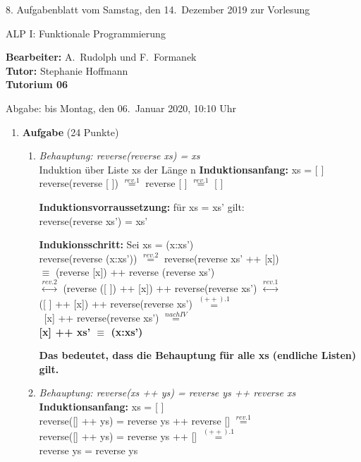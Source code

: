 \documentclass[11pt]{article}
\newcommand{\VORLESUNG}{ALP I: Funktionale Programmierung}
\newcommand{\STAFF}{A.\ Rudolph und F.\ Formanek}
\newcommand{\ASSIGNMENT}{8}
\newcommand{\HANDOUT}{Samstag, den 14.\ Dezember   2019}
\newcommand{\TUTOR}{Stephanie Hoffmann}
\newcommand{\DELIVER}{bis Montag, den 06.\ Januar 2020, 10:10 Uhr}
\newcommand{\punkte}[1]{{\small{ }(#1 Punkte)}}
\newcommand{\aufgabe}[1]{\item{\bf #1}}
\begin{document}
\begin{center}
\ASSIGNMENT{}. Aufgabenblatt vom \HANDOUT{} zur Vorlesung 
\vspace*{0.5cm}

{\Large \VORLESUNG{}}

\textbf{Bearbeiter:} \STAFF{}\\
\textbf{Tutor:} \TUTOR\\
\textbf{Tutorium 06}
\vspace*{0.5cm}

{\small Abgabe: \DELIVER{}}
\vspace*{1cm}
\end{center}
\begin{enumerate}
 \aufgabe{Aufgabe}\punkte{24}
\begin{enumerate}
\item
\textit{Behauptung: reverse(reverse xs) = xs}\\
Induktion über Liste xs der Länge n
\vspace*{0.5cm}
\newline
\textbf{Induktionsanfang:} xs = [ ]\\
reverse(reverse [ ]) $\stackrel{rev.1}{=}$ reverse [ ] $\stackrel{rev.1}{=}$ [ ]

\vspace*{0.5cm}
\textbf{Induktionsvorraussetzung:} für xs = xs' gilt:\\
reverse(reverse xs') = xs'

\vspace*{0.5cm}
\textbf{Indukionsschritt:} Sei xs = (x:xs')\\
reverse(reverse (x:xs')) $\stackrel{rev.2}{=}$ reverse(reverse xs' ++ [x])\\ 
$\equiv$ (reverse [x]) ++ reverse (reverse xs')\\ $\stackrel{rev.2}
{\leftrightarrow}$ (reverse ([ ]) ++ [x]) ++ reverse(reverse xs') $\stackrel{rev.1}{\leftrightarrow}$\\
([ ] ++ [x]) ++ reverse(reverse xs') $\stackrel{(++).1}{=}$\\
\ [x] ++ reverse(reverse xs') $\stackrel{nach IV}{=}$\\
\textbf{[x] ++ xs' $\equiv$ (x:xs')}

\vspace*{0.5cm}
\textbf{Das bedeutet, dass die Behauptung für alle xs (endliche Listen) gilt.}

\vspace*{0.5cm}
\item
\textit{Behauptung: reverse(xs ++ ys) = reverse ys ++ reverse xs}
\vspace*{0.5cm}
\newline
\textbf{Induktionsanfang:} xs = [ ]\\
reverse([] ++ ys) = reverse ys ++ reverse [] $\stackrel{rev.1}{=}$\\
reverse([] ++ ys) = reverse ys ++ [] $\stackrel{(++).1}{=}$\\
reverse ys = reverse ys


\end{enumerate}
\end{enumerate}
\end{document}
